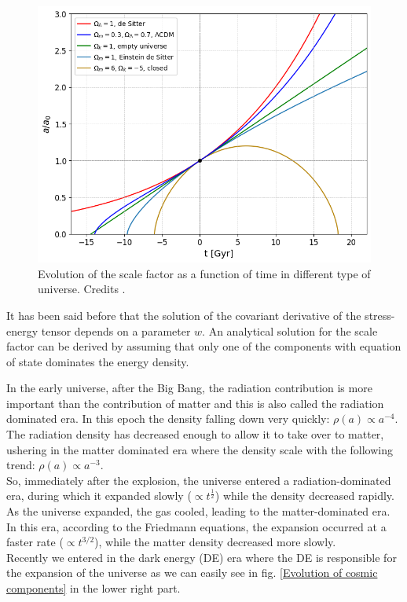 \begin{figure}[h!]
\centering
    \includegraphics[width=0.6\linewidth]{Images/Chapter1/evolution of universe.png}
    \caption[Evolution of universe in different regime]{Evolution of the scale factor as a function of time in different type of universe. Credits \cite{geek3_universe_scale}.}
\label{different universe - scale factor}
\end{figure}

It has been said before that the solution of the covariant derivative of the stress-energy tensor depends on a parameter $w$. 
An analytical solution for the scale factor can be derived by assuming that only one of the components with equation of state dominates the energy density.

In the early universe, after the Big Bang, the radiation contribution is more important than the contribution of matter and this is also called the radiation dominated era. In this epoch the density falling down very quickly: $\rho(a) \propto a^{-4}$. The radiation density has decreased enough to allow it to take over to matter, ushering in the matter dominated era where the density scale with the following trend: $\rho (a) \propto a^{-3}$.\\ So, immediately after the explosion, the universe entered a radiation-dominated era, during which it expanded slowly ($\propto t^{\frac{1}{2}}$) while the density decreased rapidly. As the universe expanded, the gas cooled, leading to the matter-dominated era. In this era, according to the Friedmann equations, the expansion occurred at a faster rate ($\propto t^{3/2}$), while the matter density decreased more slowly.\\ Recently we entered in the dark energy (DE) era where the DE is responsible for the expansion of the universe as we can easily see in fig. \ref{Evolution of cosmic components} in the lower right part.

